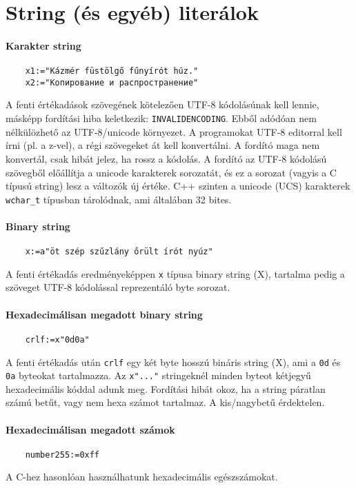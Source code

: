 \section{String (és egyéb) literálok}

\paragraph{Karakter string}
\begin{verbatim}
    x1:="Kázmér füstölgő fűnyírót húz."
    x2:="Копирование и распространение"
\end{verbatim}
A fenti értékadások  szövegének
kötelezően UTF-8 kódolásúnak kell lennie, másképp fordítási hiba
keletkezik: \verb!INVALIDENCODING!. Ebből adódóan nem nélkülözhető
az UTF-8/unicode környezet.
A programokat UTF-8 editorral kell írni (pl. a z-vel),
a régi szövegeket át kell konvertálni. A fordító maga nem konvertál,
csak hibát jelez, ha rossz a kódolás. A fordító az UTF-8 kódolású
szövegből előállítja a unicode karakterek sorozatát, és ez a sorozat 
(vagyis a C típusú string) lesz a változók új értéke.
C++ szinten a unicode (UCS) karakterek \verb!wchar_t! 
típusban tárolódnak, ami általában 32 bites. 


\paragraph{Binary string}
\begin{verbatim}
    x:=a"öt szép szűzlány őrült írót nyúz"
\end{verbatim}
A fenti értékadás eredményeképpen \verb!x! típusa binary string (X),
tartalma pedig a szöveget UTF-8 kódolással reprezentáló byte sorozat.


\paragraph{Hexadecimálisan megadott binary string}
\begin{verbatim}
    crlf:=x"0d0a"
\end{verbatim}
A fenti értékadás után \verb!crlf! egy két byte hosszú 
bináris string (X), ami a \verb!0d! és \verb!0a! byteokat tartalmazza.
Az \verb!x"..."! stringeknél minden byteot kétjegyű hexadecimális kóddal
adunk meg. Fordítási hibát okoz, ha a string páratlan számú betűt,
vagy nem hexa számot tartalmaz. A kis/nagybetű érdektelen.

\paragraph{Hexadecimálisan megadott számok}
\begin{verbatim}
    number255:=0xff
\end{verbatim}
A C-hez hasonlóan használhatunk hexadecimális egészszámokat.

